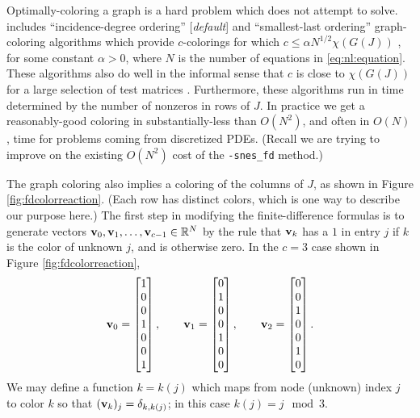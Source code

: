 Optimally-coloring a graph is a hard problem which \PETSc does not attempt to solve.  \PETSc includes ``incidence-degree ordering'' [\emph{default}] and ``smallest-last ordering'' graph-coloring algorithms which provide $c$-colorings for which $c \le \alpha N^{1/2} \chi(G(J))$ \citep{ColemanMore1983}, for some constant $\alpha>0$, where $N$ is the number of equations in \eqref{eq:nl:equation}.  These algorithms also do well in the informal sense that $c$ is close to $\chi(G(J))$ for a large selection of test matrices \citep{ColemanMore1983}.  Furthermore, these algorithms run in time determined by the number of nonzeros in rows of $J$.  In practice we get a reasonably-good coloring in substantially-less than $O(N^2)$, and often in $O(N)$, time for problems coming from discretized PDEs.  (Recall we are trying to improve on the existing $O(N^2)$ cost of the \texttt{-snes\_fd} method.)

The graph coloring also implies a coloring of the columns of $J$, as shown in Figure \ref{fig:fdcolorreaction}.  (Each row has distinct colors, which is one way to describe our purpose here.)  The first step in modifying the finite-difference formulas is to generate vectors $\mathbf{v}_0, \mathbf{v}_1, \dots, \mathbf{v}_{c-1} \in \mathbb{R}^N$ by the rule that $\mathbf{v}_k$ has a $1$ in entry $j$ if $k$ is the color of unknown $j$, and is otherwise zero.  In the $c=3$ case shown in Figure \ref{fig:fdcolorreaction},
\begin{equation}
\mathbf{v}_0 = \begin{bmatrix} 1 \\ 0 \\ 0 \\ 1 \\ 0 \\ 0 \\ 1 \end{bmatrix}, \qquad
\mathbf{v}_1 = \begin{bmatrix} 0 \\ 1 \\ 0 \\ 0 \\ 1 \\ 0 \\ 0 \end{bmatrix}, \qquad
\mathbf{v}_2 = \begin{bmatrix} 0 \\ 0 \\ 1 \\ 0 \\ 0 \\ 1 \\ 0 \end{bmatrix}.
 \label{eq:nl:coloringvecs}
\end{equation}
We may define a function $k = k(j)$ which maps from node (unknown) index $j$ to color $k$ so that $(\mathbf{v}_k)_j = \delta_{k,k(j)}$; in this case $k(j) = j\mod 3$.

